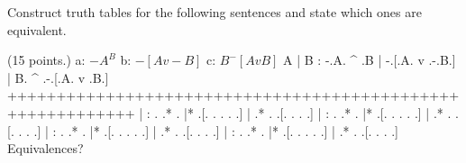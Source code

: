 \endproblems

Construct truth tables for the following sentences and state which ones are equivalent.

\problems
{} (15 points.)
\list
a: $ -A ^ B $
b: $ -[A v -B] $
c: $ B ^ -[A v B] $
\endlist
        \answer
        \truthtable
         A | B : -.A. ^ .B | -.[.A. v .-.B.] | B. ^ .-.[.A. v .B.]
        +++++++++++++++++++++++++++++++++++++++++++++++++++++++++++
           |   :  . .*  .  |* .[. .   . . .] |  .*  . .[. .   . .]
           |   :  . .*  .  |* .[. .   . . .] |  .*  . .[. .   . .]
           |   :  . .*  .  |* .[. .   . . .] |  .*  . .[. .   . .]
           |   :  . .*  .  |* .[. .   . . .] |  .*  . .[. .   . .]
        \endtruthtable
        Equivalences?
        \endanswer

\endproblems
\bye

